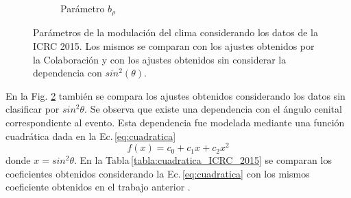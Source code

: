 \begin{figure}[H]
\begin{subfigure}[b]{\textwidth}
                    \caption{Parámetro  $b_{\rho}$	 }
                    \label{fig:brho_2015}
                    \end{subfigure}%
                    \caption{Parámetros de la modulación del clima considerando los datos de la ICRC 2015. Los mismos se comparan con los ajustes obtenidos por la Colaboración y con los ajustes obtenidos sin considerar la dependencia con $sin^2(\theta)$. }\label{fig:parameters_old}
                \end{figure}
            En la Fig. \ref{fig:parameters_old} también se compara los ajustes obtenidos considerando los datos sin clasificar por $sin^2\theta$. Se observa que existe una dependencia con el ángulo cenital correspondiente al evento. Esta dependencia fue modelada mediante una función cuadrática dada en la Ec.\,\ref{eq:cuadratica}
            \begin{equation}
                f(x) = c_0 + c_1x + c_2x^2
                \label{eq:cuadratica}
            \end{equation}
            donde $x=sin^2\theta$.  En la Tabla\,\ref{tabla:cuadratica_ICRC_2015} se comparan los coeficientes obtenidos considerando la Ec.\,\ref{eq:cuadratica} con los mismos coeficiente obtenidos en el trabajo anterior \cite{aab2017impact}. 

